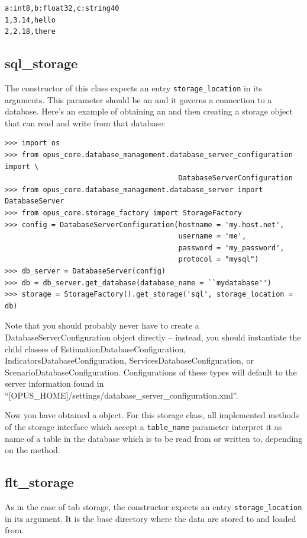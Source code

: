 \begin{verbatim}
a:int8,b:float32,c:string40
1,3.14,hello
2,2.18,there
\end{verbatim}

\subsection{sql_storage}
\label{sec:sql-storage}
%
The constructor of this class expects an entry \verb|storage_location| in its
arguments. This parameter should be an  and it governs a
connection to a database. Here's an example of obtaining an
 and then creating a storage object that can read and write from that database:

\begin{verbatim}
>>> import os
>>> from opus_core.database_management.database_server_configuration import \
                                         DatabaseServerConfiguration
>>> from opus_core.database_management.database_server import DatabaseServer
>>> from opus_core.storage_factory import StorageFactory
>>> config = DatabaseServerConfiguration(hostname = 'my.host.net',
                                         username = 'me',
                                         password = 'my_password',
                                         protocol = "mysql")
>>> db_server = DatabaseServer(config)
>>> db = db_server.get_database(database_name = ``mydatabase'')
>>> storage = StorageFactory().get_storage('sql', storage_location = db)
\end{verbatim}

Note that you should probably never have to create a
DatabaseServerConfiguration object directly -- instead, you should
instantiate the child classes of EstimationDatabaseConfiguration,
IndicatorsDatabaseConfiguration, ServicesDatabaseConfiguration, or
ScenarioDatabaseConfiguration. Configurations of these types will
default to the server information found in
``[OPUS_HOME]/settings/database_server_configuration.xml''.

Now you have obtained a  object. For this storage class,
all implemented methods of the storage interface which accept a \verb|table_name| parameter interpret it as
name of a table in the database which is to be read from or written to,
depending on the method.

\subsection{flt_storage}
\label{sec:flt-storage}
%
As in the case of tab storage, the constructor expects an entry
\verb|storage_location| in its argument. It is the base
directory where the data are stored to and loaded from.

